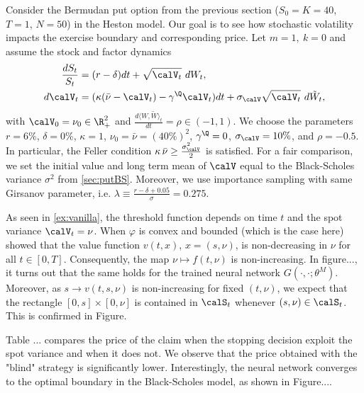 Consider the Bermudan put option from the previous section ($S_0 =K=40$, $T=1$, $N=50$) in the Heston model. Our goal is to see how stochastic volatility impacts the exercise boundary and  corresponding  price.   
 Let $m=1, \ k=0$ and assume the stock and factor dynamics
\begin{align*}
   \frac{dS_t}{S_t} &= (r-\delta)dt + \sqrt{\calV_t}\  dW_t, \\
   d\calV_t &= (\kappa(\bar{\nu}-\calV_t) - \gamma^{\Q}\calV_t)dt + \sigma_{\calV} \sqrt{\calV_t}\  d\tilde{W}_t, 
\end{align*}
with $\calV_0 = \nu_0 \in \R^2_+$ and $\frac{d\langle W, \tilde{W} \rangle_t}{dt} = \rho  \in  (-1,1)$. 
We choose the parameters
 $r = 6\%$, $\delta = 0\%$, $\kappa = 1$, $\nu_0 = \bar{\nu} = (40\%)^2$, $\gamma^{\Q} =0$, $\sigma_{\calV} =10\%$, and $\rho =-0.5$. In particular, 
the Feller condition $\kappa \,  \bar{\nu} \ge  \frac{\sigma_{\calV}^2}{2}$ is satisfied.  
For a fair comparison,  we set the initial value and long term mean of $\calV$ equal to the Black-Scholes variance $\sigma^2$ from \cref{sec:putBS}.   Moreover, we use importance sampling with same Girsanov parameter, i.e. $\lambda \equiv \frac{r-\delta + 0.05}{\sigma}  = 0.275$.

As seen in \cref{ex:vanilla}, the threshold function 
depends on time $t$ and the spot variance $\calV_t =\nu$.  
When $\varphi$ is convex and bounded (which is the case here)   \citet{LambertonHeston} showed that the value function $v(t,x)$, $x=(s,\nu)$, is  non-decreasing in $\nu$ for all $t\in [0,T]$. Consequently, the map $\nu \mapsto f(t,\nu)$ is non-increasing. In figure..., it turns out that the same holds for the trained neural network $G(\cdot,\cdot;\theta^M)$. %
Moreover, as $s \to v(t,s,\nu)$ is non-increasing for fixed $(t,\nu)$,  we expect that the  rectangle $[0,s]\times [0,\nu]$ %
is contained in $\calS_t$ whenever $(s,\nu) \in \calS_t$. This is confirmed in Figure. 

Table ... compares the price of the claim when the stopping decision exploit the spot variance and when it does not. We observe that the price obtained with the "blind" strategy is significantly lower. Interestingly, the neural network converges to the optimal boundary in the Black-Scholes model, as shown in Figure.... %

